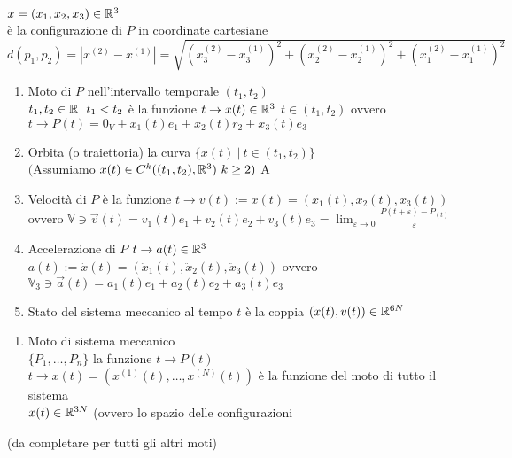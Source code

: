 \documentclass{article}
\begin{document}
	$x = (x_1,x_2,x_3)\in\mathbb{R}^3$\\
	è la configurazione di $P$ in coordinate cartesiane\\
	$d(p_1,p_2) = |x^{(2)} - x^{(1)}| = \sqrt{(x_3^{(2)} - x_3^{(1)})^2 + (x_2^{(2)} - x_2^{(1)})^2 + (x_1^{(2)} - x_1^{(1)})^2}$ 
	\newpage
	\begin{defi}[Moto] \text{} 
\begin{enumerate}
	\item Moto di $P$ nell'intervallo temporale $(t_1,t_2)$\\
		$t_1,t_2\in\mathbb{R}\ \ t_1 < t_2$ è la funzione $t \rightarrow x(t)\in\mathbb{R}^3$ $t\in(t_1,t_2)$ ovvero $t \rightarrow P(t) = 0_V + x_1(t)e_1 + x_2(t)r_2 + x_3(t)e_3$ 
	\item Orbita (o traiettoria) la curva $\{x(t)\  |\  t\in (t_1,t_2)\}$ \\
		$($Assumiamo $x(t)\in C^k ( (t_1,t_2),\mathbb{R}^3) \ k\geq 2)$ A
	\item Velocità di $P$ è la funzione $t \rightarrow v(t) := x(t) = (x_1(t),x_2(t),x_3(t))$ \\
	ovvero $ \mathbb V\ni \overrightarrow{v}(t)= v_1(t)e_1 + v_2(t) e_2 + v_3(t)e_3 = \lim_{\varepsilon \rightarrow 0 }\frac{P(t + \varepsilon)-P_(t)}{\varepsilon}$ 
\item Accelerazione di $P$  $t \rightarrow a(t)\in \mathbb{R}^3$\\
	$a(t) := \ddot x(t) = (\ddot x_1(t), \ddot x_2(t), \ddot x_3(t)) $ ovvero\\
$\mathbb V_3\ni \overrightarrow{a}(t) = a_1(t)e_1 + a_2(t)e_2 + a_3(t)e_3$ 
\item Stato del sistema meccanico al tempo $t$ è la coppia $(x(t), v(t))\in\mathbb{R}^{6N}$
\end{enumerate} 
	\end{defi}
	\begin{defi}
		\text{}
		\begin{enumerate}
			\item Moto di sistema meccanico\\
				$\{P_1,\ldots,P_n\}$ la funzione $t \rightarrow P(t)$ \ \ $t \rightarrow x(t) = (x^{(1)}(t), \ldots, x^{(N)}(t))$ è la funzione del moto di tutto il sistema\\
				$x(t)\in \mathbb{R}^{3N}$ (ovvero lo spazio delle configurazioni 
		\end{enumerate}
		(da completare per tutti gli altri moti)
	\end{defi}
\end{document}
